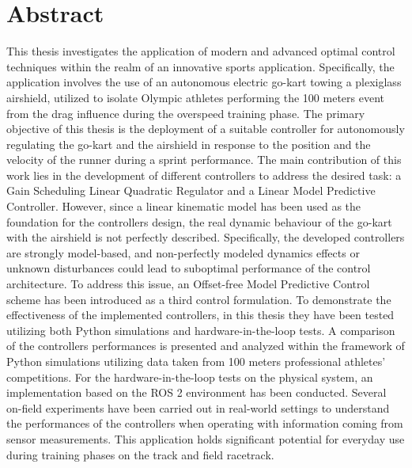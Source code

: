 \documentclass[a4paper,12pt,oneside]{book}
\begin{document}
\chapter*{Abstract}
This thesis investigates the application of modern and advanced optimal control techniques within the realm of an innovative sports application. 
Specifically, the application involves the use of an autonomous electric go-kart towing a plexiglass airshield, utilized to isolate Olympic athletes performing the 100 meters event from the drag influence during the overspeed training phase. 
The primary objective of this thesis is the deployment of a suitable controller for autonomously regulating the go-kart and the airshield in response to the position and the velocity of the runner during a sprint performance. 
The main contribution of this work lies in the development of different controllers to address the desired task: a Gain Scheduling Linear Quadratic Regulator and a Linear Model Predictive Controller. 
However, since a linear kinematic model has been used as the foundation for the controllers design, the real dynamic behaviour of the go-kart with the airshield is not perfectly described.
Specifically, the developed controllers are strongly model-based, and non-perfectly modeled dynamics effects or unknown disturbances could lead to suboptimal performance of the control architecture.  
To address this issue, an Offset-free Model Predictive Control scheme has been introduced as a third control formulation. 
To demonstrate the effectiveness of the implemented controllers, in this thesis they have been tested utilizing both Python simulations and hardware-in-the-loop tests.
A comparison of the controllers performances is presented and analyzed within the framework of Python simulations utilizing data taken from 100 meters professional athletes' competitions. 
For the hardware-in-the-loop tests on the physical system, an implementation based on the ROS 2 environment has been conducted. 
Several on-field experiments have been carried out in real-world settings to understand the performances of the controllers when operating with information coming from sensor measurements. 
This application holds significant potential for everyday use during training phases on the track and field racetrack.




\tableofcontents



\end{document}
